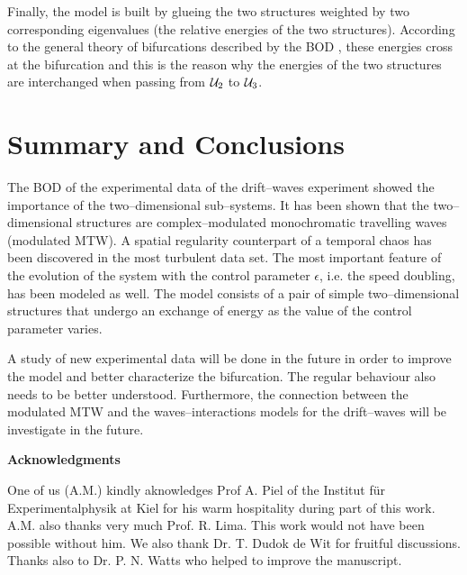 Finally, the model is built by glueing the two structures weighted 
by two corresponding eigenvalues (the relative energies of the
two structures). According to the general theory of bifurcations
described by the BOD \cite{LimaSym}, these energies cross
at the bifurcation and this is the reason why the energies of
the two structures are interchanged when passing from ${\cal U}_2$ 
to ${\cal U}_3$.\section{Summary and Conclusions}
The BOD of the experimental data of the drift--waves experiment
showed the importance of the two--dimensional sub--systems.
It has been shown that the two--dimensional structures are
complex--modulated monochromatic travelling waves (modulated MTW).
A spatial regularity counterpart of a temporal chaos has been
discovered in the most turbulent data set. 
The most important feature of the evolution of the
system with the control parameter $\epsilon$, i.e. the speed 
doubling, has been modeled as well.
The model consists of a pair of simple two--dimensional structures that 
undergo an exchange of energy as  the value of the 
control parameter varies.

\medskip

A study of new experimental data will be done in the future
in order to improve the model and better characterize the bifurcation.
The regular behaviour also needs to be better understood. 
Furthermore, the connection between the modulated MTW and the
waves--interactions models for the drift--waves will be 
investigate in the future.

{\bf Acknowledgments} 

One of us (A.M.) kindly aknowledges Prof A. Piel of the Institut
f\"ur Experimentalphysik at Kiel for his warm hospitality
during part of this work. A.M. also thanks very much Prof. R. Lima.
This work would not have been possible without him. 
We also thank Dr. T. Dudok de Wit for fruitful discussions.
Thanks also
to Dr. P. N. Watts who helped to improve the manuscript.


